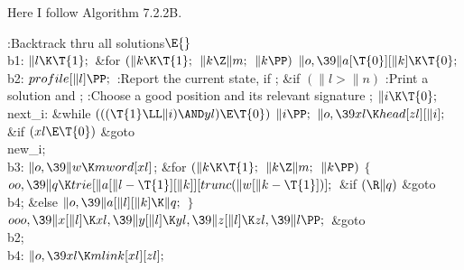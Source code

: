 Here I follow Algorithm 7.2.2B.

\Y\B\4:Backtrack thru all solutions\X${}\E{}$\6
\4\\{b1}:\5
${}\|l\K\T{1};{}$\6
\&{for} ${}(\|k\K\T{1};{}$ ${}\|k\Z\|m;{}$ ${}\|k\PP){}$\1\5
${}\|o,\39\|a[\T{0}][\|k]\K\T{0};{}$\2\6
\4\\{b2}:\5
${}\\{profile}[\|l]\PP;{}$\6
:Report the current state, if \X;\6
\&{if} ${}(\|l>\|n){}$\1\5
:Print a solution and \X;\2\6
:Choose a good position  and its relevant signature %
\X;\6
${}\|i\K\T{0};{}$\6
\4\\{next\_i}:\5
\&{while} ${}(((\T{1}\LL\|i)\AND\\{yl})\E\T{0}){}$\1\5
${}\|i\PP;{}$\2\6
${}\|o,\39\\{xl}\K\\{head}[\\{zl}][\|i];{}$\6
\&{if} ${}(\\{xl}\E\T{0}){}$\1\5
\&{goto} \\{new\_i};\2\6
\4\\{b3}:\5
${}\|o,\39\|w\K\\{mword}[\\{xl}]{}$;\6
\&{for} ${}(\|k\K\T{1};{}$ ${}\|k\Z\|m;{}$ ${}\|k\PP){}$\5
${}\{{}$\1\6
${}\\{oo},\39\|q\K\\{trie}[\|a[\|l-\T{1}][\|k]][\\{trunc}(\|w[\|k-\T{1}])];{}$\6
\&{if} ${}(\R\|q){}$\1\5
\&{goto} \\{b4};\5
\2\&{else}\1\5
${}\|o,\39\|a[\|l][\|k]\K\|q;{}$\2\6
\4${}\}{}$\2\6
${}\\{ooo},\39\|x[\|l]\K\\{xl},\39\|y[\|l]\K\\{yl},\39\|z[\|l]\K\\{zl},\39\|l%
\PP;{}$\6
\&{goto} \\{b2};\6
\4\\{b4}:\5
${}\|o,\39\\{xl}\K\\{mlink}[\\{xl}][\\{zl}];{}$\6
